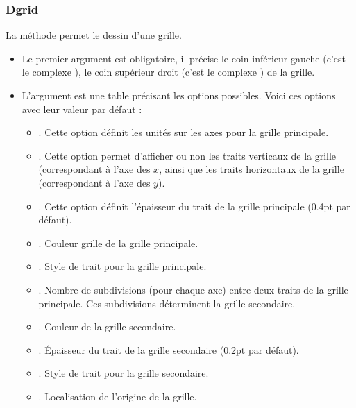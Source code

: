 \subsubsection{Dgrid}

La méthode  permet le dessin d'une grille.
\begin{itemize}
    \item Le premier argument est obligatoire, il précise le coin inférieur gauche (c'est le complexe ), le coin supérieur droit (c'est le complexe ) de la grille.
    \item L'argument  est une table précisant les options possibles. Voici ces options avec leur valeur par défaut :
        \begin{itemize}
            \item {}. Cette option définit les unités sur les axes pour la grille principale.
            \item {}. Cette option permet d'afficher ou non les traits verticaux de la grille (correspondant à l'axe des $x$, ainsi que les traits horizontaux de la grille (correspondant à l'axe des $y$).
            \item {}. Cette option définit l'épaisseur du trait de la grille principale (0.4pt par défaut).
            \item {}. Couleur grille de la grille principale.
            \item {}. Style de trait pour la grille principale.
            \item {}. Nombre de subdivisions (pour chaque axe) entre deux traits de la grille principale. Ces subdivisions déterminent la grille secondaire.
            \item {}. Couleur de la grille secondaire.
            \item {}. Épaisseur du trait de la grille secondaire (0.2pt par défaut).
            \item {}. Style de trait pour la grille secondaire.
            \item {}. Localisation de l'origine de la grille.
        \end{itemize}
\end{itemize}

